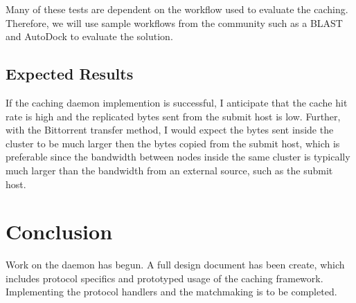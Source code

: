 Many of these tests are dependent on the workflow used to evaluate the caching.  Therefore, we will use sample workflows from the community such as a BLAST and AutoDock to evaluate the solution.

\subsection{Expected Results}

If the caching daemon implemention is successful, I anticipate that the cache hit rate is high and the replicated bytes sent from the submit host is low.  Further, with the Bittorrent transfer method, I would expect the bytes sent inside the cluster to be much larger then the bytes copied from the submit host, which is preferable since the bandwidth between nodes inside the same cluster is typically much larger than the bandwidth from an external source, such as the submit host.

\section{Conclusion}

Work on the daemon has begun.  A full design document has been create, which includes protocol specifics and prototyped usage of the caching framework.  Implementing the protocol handlers and the matchmaking is to be completed.



